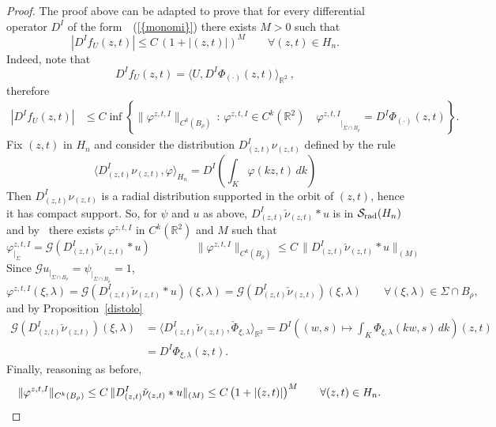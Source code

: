 \documentclass[12pt,a4paper]{amsart}
\theoremstyle{plain}
\theoremstyle{definition}
\numberwithin{equation}{section}
\begin{document}
\begin{proof}
The proof above can be adapted to prove that for every differential operator ${{D}}^I  $ 
of the form~{~(\ref{{monomi}})}
there exists $M>0$ such that   
$$
|{{D}}^I f_U(z,t)|\leq C\, (1+|(z,t)|)^M
\qquad \forall (z,t)\in {{H_{n}}}.
$$
Indeed, note that
$$
 {{D}}^I f_U(z,t)={\langle {U},{{{D}}^I\Phi_{(\cdot)}(z,t)} \rangle_{{\mathbb R}^2}}\ ,
$$
therefore
\begin{align*}
| {{D}}^I f_U(z,t)|
&\leq C \inf{\left\{{\|\varphi^{z,t,I}\|_{C^k(B_\rho)}\,:\,\varphi^{z,t,I}\in C^k({\mathbb R}^2)\quad
{\varphi^{z,t,I}}_{|_{{\Sigma}\cap B_\rho}}= {{D}}^I \Phi_{(\cdot)}(z,t)}\right\}}.
\end{align*} 
Fix $(z,t)$ in ${{H_{n}}}$ and consider the distribution
 ${{D}}^I_{(z,t)}\nu_{(z,t)}$ defined by the rule
$$
{\langle {{{D}}^I_{(z,t)}\nu_{(z,t)}},{\varphi} \rangle_{{H_{n}}}}
={{D}}^I\left(\int_K \varphi(kz,t)\, dk \right)
$$
Then ${{D}}^I_{(z,t)}\nu_{(z,t)}$ is a radial distribution
 supported in the orbit of $(z,t)$,
hence it has compact support. So, for $\psi$ and $u$ as above,
${{D}}^I_{(z,t)}\check\nu_{(z,t)}*u$ is in ${{\mathcal S}_{\text{\rm rad}}({{H_{n}}})}$ and
by~\cite[Proposition~3.2]{ADR} there exists
$\varphi^{z,t,I}$ in $C^k({\mathbb R}^2)$ and $M$ such that
$$
\varphi^{z,t,I}_{|_{\Sigma}}={\mathcal G}({{D}}^I_{(z,t)}\check\nu_{(z,t)}*u)
\qquad\qquad
\|\varphi^{z,t,I}\|_{C^k(B_\rho)}\leq C\,\|{{D}}^I_{(z,t)}\check\nu_{(z,t)}*u\|_{(M)}
$$
Since ${\mathcal G} u_{|_{{\Sigma}\cap B_\rho}}=\psi_{|_{{\Sigma}\cap B_\rho}}=1$,
$$
\varphi^{z,t,I}(\xi,{\lambda})={\mathcal G}({{D}}^I_{(z,t)}\check\nu_{(z,t)}*u)(\xi,{\lambda})
={\mathcal G}({{D}}^I_{(z,t)}\check\nu_{(z,t)})(\xi,{\lambda})
\qquad \forall (\xi,{\lambda})\in {\Sigma}\cap B_\rho ,
$$
and by Proposition~\ref{distolo}
\begin{align*}
{\mathcal G}({{D}}^I_{(z,t)}\check\nu_{(z,t)})(\xi,{\lambda})
&=
{\langle {{{D}}^I_{(z,t)}\check\nu_{(z,t)}},{\check\Phi_{\xi,{\lambda}}} \rangle_{{\mathbb R}^2}}
={{D}}^I\left((w,s)\mapsto\int_K \Phi_{\xi,{\lambda}}(kw,s)\, dk \right)(z,t)
\\
&={{D}}^I\Phi_{\xi,{\lambda}}(z,t).
\end{align*} 
Finally, reasoning as before,
 \begin{align*}
\| \varphi^{z,t,I}\|_{C^k( B_\rho)}
&\leq 
C\,\|{{D}}^I_{(z,t)}\check\nu_{(z,t)}*u\|_{(M)}
\leq    C \, \big(1+|(z,t)|\big)^{M}
\qquad
\forall (z,t)\in {{H_{n}}}.
\qedhere
\end{align*}
\end{proof}
\end{document}
